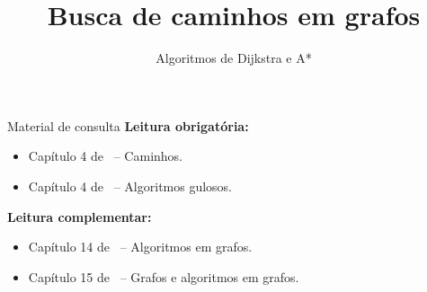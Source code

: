 \newcommand{\templatesdir}{../../../templates}
\newcommand{\template}{template-slides-est}


\title[Busca de caminhos em grafos]{Busca de caminhos em grafos}
\subtitle{Algoritmos de Dijkstra e A*}



\maketitle

\begin{frame}{Material de consulta}
	\textbf{Leitura obrigatória:}
	\begin{itemize}
		\item Capítulo 4 de~\cite{Goldbarg2AndGoldbarg2012} -- Caminhos.
		\item Capítulo 4 de~\cite{KleinbergAndTardos2006} -- Algoritmos gulosos.
	\end{itemize}
	
	\bigskip
	
	\textbf{Leitura complementar:}
	\begin{itemize}
		\item Capítulo 14 de~\cite{GoodrichEtAl2014} -- Algoritmos em grafos.
		\item Capítulo 15 de~\cite{Preiss2001} -- Grafos e algoritmos em grafos.
	\end{itemize}
\end{frame}



